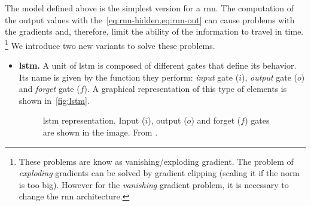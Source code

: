 The model defined above is the simplest version for a \gls{rnn}. The
computation of the output values with the\ \vref{eq:rnn-hidden,eq:rnn-out} can
cause problems with the gradients and, therefore, limit the ability of the
information to travel in time.%
\footnote{These problems are know as vanishing/exploding gradient. The problem
  of \emph{exploding} gradients can be solved by gradient clipping (scaling it
  if the norm is too big). However for the \emph{vanishing} gradient problem,
  it is necessary to change the \gls{rnn} architecture.} We introduce two new
variants to solve these problems.
\begin{itemize}
  \item \textbf{\gls{lstm}.} A unit of \gls{lstm} is composed of different
  gates that define its behavior. Its name is given by the function they
  perform: \emph{input} gate (\(i\)), \emph{output} gate (\(o\)) and
  \emph{forget} gate (\(f\)). A graphical representation of this type of
  elements is shown in\ \vref{fig:lstm}.
  \begin{figure}[ht]
    \centering
    
    \caption[ representation]{\acf{lstm}
      representation. Input (\(i\)), output (\(o\)) and forget (\(f\)) gates
      are shown in the image. From
      .}%
    \label{fig:lstm}
  \end{figure}


\end{itemize}
